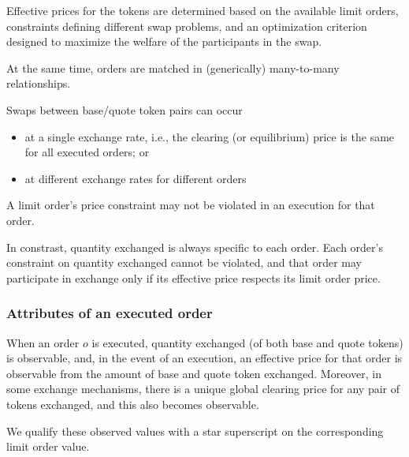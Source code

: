 \documentclass[11pt, reqno]{amsart}
\theoremstyle{definition}
\theoremstyle{remark}
\begin{document}
Effective prices for the tokens are determined based on the available limit
orders, constraints defining different swap problems, and an optimization
criterion designed to maximize the welfare of the participants in the swap.

At the same time, orders are matched in (generically) many-to-many relationships.

Swaps between base/quote token pairs can occur
\begin{itemize}
  \item at a single exchange rate, i.e., the
clearing (or equilibrium) price is the same for all executed orders; or
  \item at different exchange rates for different orders
\end{itemize}
A limit order's price constraint may not be violated in an execution for that
order.

In constrast, quantity exchanged is always specific to each order. Each
order's constraint on quantity exchanged cannot be violated, and that order
may participate in exchange only if its effective price respects its limit
order price.

\subsubsection{Attributes of an executed order}
When an order $o$ is executed, quantity exchanged (of both base and quote
tokens) is observable, and, in the event of an execution, an effective
price for that order is observable from the amount of base and quote token
exchanged. Moreover, in some exchange mechanisms, there is a unique global
clearing price for any pair of tokens exchanged, and this also becomes
observable.

We qualify these observed values with a star superscript on the
corresponding limit order value.
\end{document}
